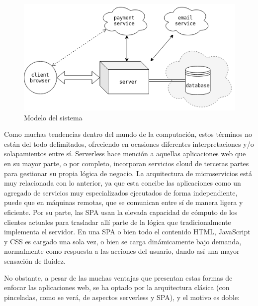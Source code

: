 \documentclass[a4paper]{article}
\begin{document}
    \begin{figure}[h]
    	\centering
    	\includegraphics[width=\textwidth]{desing_general}
    	\caption{Modelo del sistema}
    	\label{fig:desing_general}
    \end{figure}
    
    Como muchas tendencias dentro del mundo de la computación, estos términos no están del todo delimitados, ofreciendo en ocasiones diferentes interpretaciones y/o solapamientos entre sí. Serverless hace mención a aquellas aplicaciones web que en su mayor parte, o por completo, incorporan servicios cloud de terceras partes para gestionar su propia lógica de negocio. La arquitectura de microservicios está muy relacionada con lo anterior, ya que esta concibe las aplicaciones como un agregado de servicios muy especializados ejecutados de forma independiente, puede que en máquinas remotas, que se comunican entre sí de manera ligera y eficiente. Por su parte, las SPA usan la elevada capacidad de cómputo de los clientes actuales para trasladar allí parte de la lógica que tradicionalmente implementa el servidor. En una SPA o bien todo el contenido HTML, JavaScript y CSS es cargado una sola vez, o bien se carga dinámicamente bajo demanda, normalmente como respuesta a las acciones del usuario, dando así una mayor sensación de fluidez.
    
    No obstante, a pesar de las muchas ventajas que presentan estas formas de enfocar las aplicaciones web, se ha optado por la arquitectura clásica (con pinceladas, como se verá, de aspectos serverless y SPA), y el motivo es doble:
    
\end{document}
